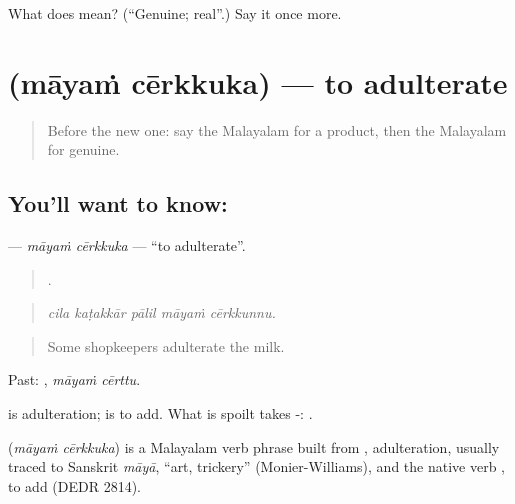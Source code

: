 \begin{tcolorbox}[breakable,colback=teal!4,colframe=teal!35!black,title={Before you move on}]
What does  mean? (\textquotedblleft{}Genuine; real\textquotedblright{}.) Say it once more.
\end{tcolorbox}
\section[\texorpdfstring{\ml{മായം} \ml{ചേർക്കുക} (māyaṁ cērkkuka)}{മായം ചേർക്കുക (māyaṁ cērkkuka)}]{  (māyaṁ cērkkuka) — to adulterate}

\label{lesson:ML-C492-mayam-cerkkuka}



\begin{quote}
Before the new one: say the Malayalam for a product, then the Malayalam for genuine.
\end{quote}

\subsection*{You'll want to know:  }
\textbf{ } — \emph{māyaṁ cērkkuka} — \textquotedblleft{}to adulterate\textquotedblright{}.

\begin{quote}
    .
\end{quote}

\begin{quote}
\emph{cila kaṭakkār pālil māyaṁ cērkkunnu.}
\end{quote}

\begin{quote}
Some shopkeepers adulterate the milk.
\end{quote}

Past:  , \emph{māyaṁ cērttu}.

 is adulteration;  is to add. What is spoilt takes -: .

\begin{cousinweb}
\textbf{ } (\emph{māyaṁ cērkkuka}) is a Malayalam verb phrase built from , adulteration, usually traced to Sanskrit \emph{māyā}, \textquotedblleft{}art, trickery\textquotedblright{} (Monier-Williams), and the native verb , to add (DEDR 2814).
\end{cousinweb}

